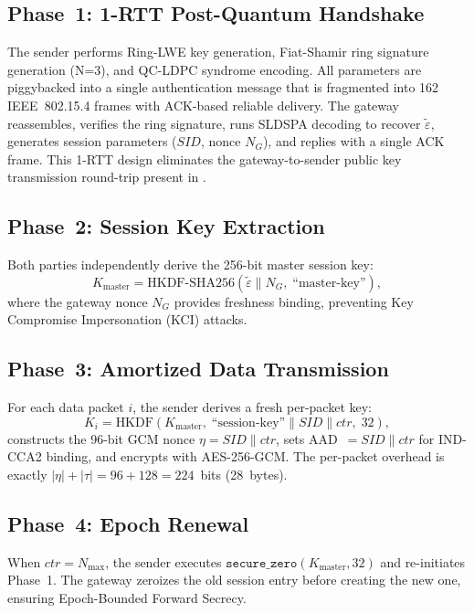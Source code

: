 \documentclass[conference]{IEEEtran}
\newcommand{\Kmaster}{K_{\mathrm{master}}}
\newcommand{\Nmax}{N_{\max}}
\newcommand{\SID}{\mathit{SID}}
\begin{document}
\subsection{Phase~1: 1-RTT Post-Quantum Handshake}

The sender performs Ring-LWE key generation, Fiat-Shamir ring
signature generation (N=3), and QC-LDPC syndrome encoding. All
parameters are piggybacked into a single authentication message that
is fragmented into 162 IEEE~802.15.4 frames with ACK-based reliable
delivery. The gateway reassembles, verifies the ring signature,
runs SLDSPA decoding to recover $\tilde{\varepsilon}$, generates
session parameters ($\SID$, nonce $N_G$), and replies with a single
ACK frame. This 1-RTT design eliminates the gateway-to-sender public
key transmission round-trip present in \cite{kumari2022}.

\subsection{Phase~2: Session Key Extraction}

Both parties independently derive the 256-bit master session key:
\begin{equation}
\Kmaster = \text{HKDF-SHA256}(\tilde{\varepsilon} \| N_G,\;
\text{``master-key''}),
\label{eq:kmaster}
\end{equation}
where the gateway nonce $N_G$ provides freshness binding, preventing
Key Compromise Impersonation (KCI) attacks.

\subsection{Phase~3: Amortized Data Transmission}

For each data packet $i$, the sender derives a fresh per-packet key:
\begin{equation}
K_i = \text{HKDF}(\Kmaster,\; \text{``session-key''} \| \SID \| ctr,\;
32),
\label{eq:ki}
\end{equation}
constructs the 96-bit GCM nonce $\eta = \SID \| ctr$, sets
AAD~$= \SID \| ctr$ for IND-CCA2 binding, and encrypts with
AES-256-GCM. The per-packet overhead is exactly
$|\eta| + |\tau| = 96 + 128 = 224$~bits (28~bytes).

\subsection{Phase~4: Epoch Renewal}

When $ctr = \Nmax$, the sender executes
$\texttt{secure\_zero}(\Kmaster, 32)$ and re-initiates Phase~1. The
gateway zeroizes the old session entry before creating the new one,
ensuring Epoch-Bounded Forward Secrecy.
\end{document}
